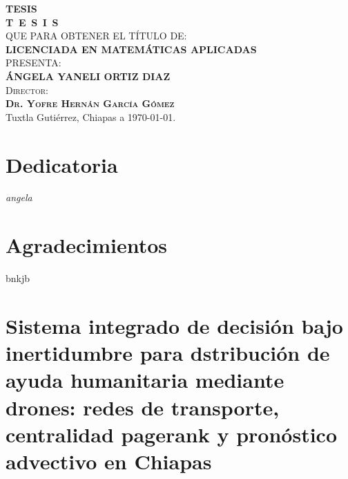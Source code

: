 \documentclass[
  spanish,
  us-letterpaper,
]{scrreprt}
\numberwithin{equation}{section}
\renewcommand*\contentsname{Tabla de contenidos}
\newcommand\contentsname{Tabla de contenidos}
\begin{document}
\begin{titlepage}
\begin{minipage}[t][0.95\textheight][c]{0.76\textwidth}
            \begin{center}
                {\Large\bfseries TESIS}\\[2cm]
                \textsc{\huge \textbf{T\, E\, S\, I\, S}}\\[1.5cm]
                \textsc{\large QUE PARA OBTENER EL TÍTULO DE:}\\[0.3cm]
                \textbf{\textsc{LICENCIADA EN MATEMÁTICAS APLICADAS}}\\[1.5cm]
                \textsc{\large PRESENTA:}\\[0.3cm]
                \textbf{\textsc{\large {ÁNGELA YANELI ORTIZ DIAZ}}}\\[2cm]
                {\large\scshape Director:\\[0.3cm]
                {\textbf{\large Dr. Yofre Hernán García Gómez }}}\\[2.0cm]
                \large{Tuxtla Gutiérrez, Chiapas a \today.}

            \end{center}
\end{minipage}
\end{titlepage}

\pagebreak[2]

\chapter*{Dedicatoria}
\begin{center}
\itshape
\setlength{\parindent}{0pt} %
\setlength{\parskip}{1.2\baselineskip} %
angela
\end{center}
\chapter*{Agradecimientos}
bnkjb

\renewcommand*\contentsname{Tabla de contenidos}
{
\hypersetup{linkcolor=}
\setcounter{tocdepth}{2}
\tableofcontents
}


\chapter{Sistema integrado de decisión bajo inertidumbre para
dstribución de ayuda humanitaria mediante drones: redes de transporte,
centralidad pagerank y pronóstico advectivo en
Chiapas}\label{sistema-integrado-de-decisiuxf3n-bajo-inertidumbre-para-dstribuciuxf3n-de-ayuda-humanitaria-mediante-drones-redes-de-transporte-centralidad-pagerank-y-pronuxf3stico-advectivo-en-chiapas}
\end{document}
